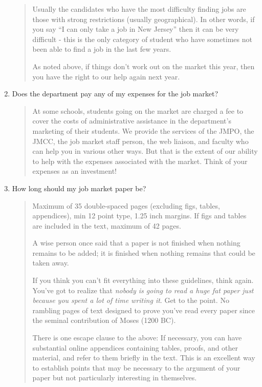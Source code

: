 \documentclass{\classes/econtex}
\begin{document}
\begin{enumerate}
\begin{quote}
    Usually the candidates who have the most difficulty finding jobs are
    those with strong restrictions (usually geographical).  In other
    words, if you say ``I can only take a job in New Jersey'' then it can
    be very difficult - this is the only category of student who 
    have sometimes not been able to find a job in the last few years.

    As noted above, if things don't work out on the market this year, then
    you have the right to our help again next year.

  \end{quote}

\item  Does the department pay any of my expenses for the job market?

  \begin{quote}  
  At some schools, students going on the market are charged a fee to cover the costs of administrative assistance in the department's marketing of their students.  We provide the services of the JMPO, the JMCC, the job market staff person, the web liaison, and faculty who can help you in various other ways.  But that is the extent of our ability to help with the expenses associated with the market.  Think of your expenses as an investment!


\end{quote}

\item  How long should my job market paper be?

  \begin{quote}
    Maximum of 35 double-spaced pages (excluding figs, tables,
    appendices), min 12 point type, 1.25 inch margins.  If figs and
    tables are included in the text, maximum of 42 pages.   
    
    A wise person once said that a paper is not finished when nothing
    remains to be added; it is finished when nothing remains that could
    be taken away.
    
    If you think you can't fit everything into these guidelines, think
    again.  You've got to realize that \textit{nobody is going to read a
      huge fat paper just because you spent a lot of time writing it}.
    Get to the point.  No rambling pages of text designed to prove you've
    read every paper since the seminal contribution of Moses (1200 BC).

    There is one escape clause to the above: If necessary, you can have
    substantial online appendices containing tables, proofs, and other material, and
    refer to them briefly in the text.  This is an excellent way to
    establish points that may be necessary to the argument of your paper
    but not particularly interesting in themselves.   


\end{quote}
\end{enumerate}
\end{document}
